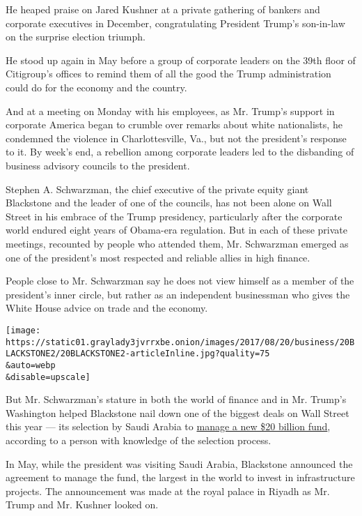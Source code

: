 He heaped praise on Jared Kushner at a private gathering of bankers and
corporate executives in December, congratulating President Trump's
son-in-law on the surprise election triumph.

He stood up again in May before a group of corporate leaders on the 39th
floor of Citigroup's offices to remind them of all the good the Trump
administration could do for the economy and the country.

And at a meeting on Monday with his employees, as Mr. Trump's support in
corporate America began to crumble over remarks about white
nationalists, he condemned the violence in Charlottesville, Va., but not
the president's response to it. By week's end, a rebellion among
corporate leaders led to the disbanding of business advisory councils to
the president.

Stephen A. Schwarzman, the chief executive of the private equity giant
Blackstone and the leader of one of the councils, has not been alone on
Wall Street in his embrace of the Trump presidency, particularly after
the corporate world endured eight years of Obama-era regulation. But in
each of these private meetings, recounted by people who attended them,
Mr. Schwarzman emerged as one of the president's most respected and
reliable allies in high finance.

People close to Mr. Schwarzman say he does not view himself as a member
of the president's inner circle, but rather as an independent
businessman who gives the White House advice on trade and the economy.

\texttt{[image: https://static01.graylady3jvrrxbe.onion/images/2017/08/20/business/20BLACKSTONE2/20BLACKSTONE2-articleInline.jpg?quality=75\\\&auto=webp\\\&disable=upscale]}

But Mr. Schwarzman's stature in both the world of finance and in Mr.
Trump's Washington helped Blackstone nail down one of the biggest deals
on Wall Street this year --- its selection by Saudi Arabia to
\href{https://www.nytimes3xbfgragh.onion/2017/05/20/business/dealbook/saudi-arabia-to-invest-20-billion-in-infrastructure-mostly-in-us.html}{manage
a new \$20 billion fund}, according to a person with knowledge of the
selection process.

In May, while the president was visiting Saudi Arabia, Blackstone
announced the agreement to manage the fund, the largest in the world to
invest in infrastructure projects. The announcement was made at the
royal palace in Riyadh as Mr. Trump and Mr. Kushner looked on.

